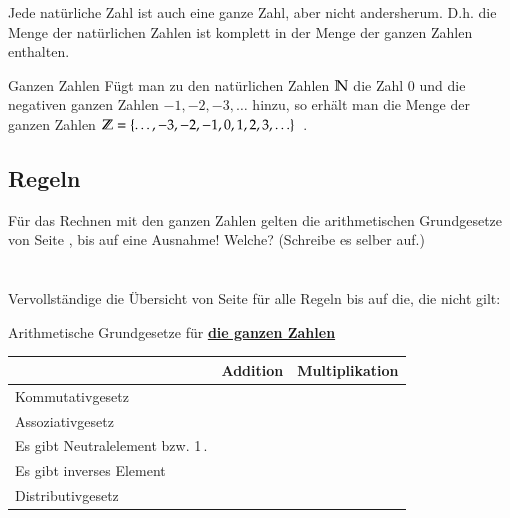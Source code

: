 Jede natürliche Zahl ist auch eine ganze Zahl, aber nicht andersherum.
D.h. die Menge der natürlichen Zahlen ist komplett in der Menge der ganzen Zahlen enthalten.

\vspace{1cm}
\begin{defn}{Ganzen Zahlen}
	Fügt man zu den natürlichen Zahlen $\mathbb{N}$ die Zahl 0 und die negativen ganzen Zahlen $-1, -2, -3,\ldots$ hinzu,
	so erhält man die Menge der ganzen Zahlen $\mathbb{Z} = \{ \ldots, -3, -2, -1, 0, 1, 2, 3, \ldots \}$\, .
\end{defn}


\subsection{Regeln}
Für das Rechnen mit den ganzen Zahlen gelten die arithmetischen Grundgesetze von Seite \pageref{law:arithmetic}, bis auf eine Ausnahme!
Welche? (Schreibe es selber auf.)\\
\\~\\
Vervollständige die Übersicht von Seite \pageref{law:arithmetic} für alle Regeln bis auf die, die nicht gilt:
\begin{law}{Arithmetische Grundgesetze für \underline{\bfseries die ganzen Zahlen}}
    \bgroup
    \def\arraystretch{2.5}
	\begin{tabularx}{\linewidth}{|X|p{3.7cm}|p{3.7cm}|}
			\hline
			 & Addition & Multiplikation \\
			\hline
			Kommutativgesetz &  &  \\\hline
			Assoziativgesetz &  &  \\\hline
			Es gibt Neutralelement\newline 0 bzw. 1\,. &  &  \\\hline
			Es gibt inverses Element\newline~ & & \\
			\hline
			Distributivgesetz & \multicolumn{2}{c|}{} \\
			\hline
    \end{tabularx}
    \egroup
\end{law}


